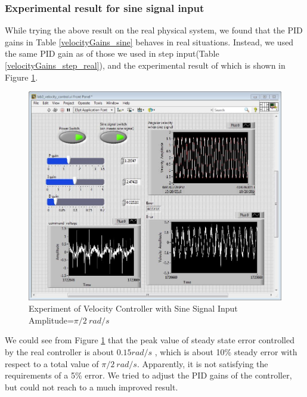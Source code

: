 \documentclass[letterpaper]{article}
\begin{document}
\subsubsection*{Experimental result for sine signal input}
While trying the above result on the real physical system, we found that the PID gains in Table \ref{velocityGains_sine} behaves in real situations. Instead, we used the same PID gain as of those we used in step input(Table \ref{velocityGains_step_real}), and the experimental result of which is shown in Figure \ref{velocity_control_sine_5hz}.\\
\begin{figure}[H]
\begin{center}
\includegraphics[width = 15cm]{velocity_control_sine_5hz.JPG}
\caption{Experiment of Velocity Controller with Sine Signal Input Amplitude=$\pi/2 \ rad/s$}
\label{velocity_control_sine_5hz}
\end{center}
\end{figure}

We could see from Figure \ref{velocity_control_sine_5hz} that the peak value of steady state error controlled by the real controller is about $0.15 rad/s$ , which is about 10\% steady error with respect to a total value of $\pi /2 \ rad/s$. Apparently, it is not satisfying the requirements of a 5\% error. We tried to adjust the PID gains of the controller, but could not reach to a much improved result. \\
\end{document}
